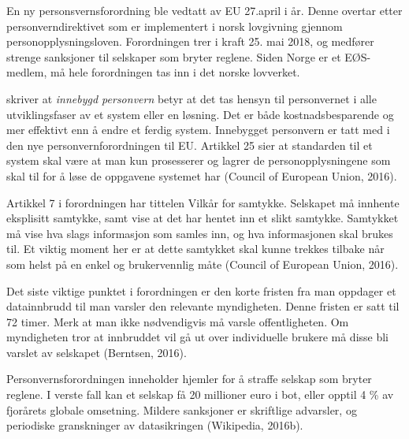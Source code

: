 En ny personsvernsforordning ble vedtatt av EU 27.april i år. Denne overtar
etter personverndirektivet som er implementert i norsk lovgivning gjennom
personopplysningsloven. Forordningen trer i kraft 25. mai 2018, og medfører
strenge sanksjoner til selskaper som bryter reglene. Siden Norge er et EØS-medlem,
må hele forordningen tas inn i det norske lovverket.

\citet{datatilsynet_privacy} skriver at \textit{innebygd personvern} betyr at det tas hensyn
til personvernet i alle utviklingsfaser av et system eller en løsning. Det er
både kostnadsbesparende og mer effektivt enn å endre et ferdig system. Innebygget
personvern er tatt med i den nye personvernforordningen til EU.
Artikkel 25 sier at standarden til et system skal være at man kun prosesserer
og lagrer de personopplysningene som skal til for å løse de oppgavene
systemet har (Council of European Union, 2016).

Artikkel 7 i forordningen har tittelen Vilkår for samtykke. Selskapet må
innhente eksplisitt samtykke, samt vise at det har hentet inn et slikt samtykke.
Samtykket må vise hva slags informasjon som samles inn, og hva informasjonen
skal brukes til. Et viktig moment her er at dette samtykket skal kunne
trekkes tilbake når som helst på en enkel og brukervennlig måte (Council of
European Union, 2016).

Det siste viktige punktet i forordningen er den korte fristen fra man oppdager
et datainnbrudd til man varsler den relevante myndigheten. Denne fristen er
satt til 72 timer. Merk at man ikke nødvendigvis må varsle offentligheten. Om
myndigheten tror at innbruddet vil gå ut over individuelle brukere må disse
bli varslet av selskapet (Berntsen, 2016).

Personvernsforordningen inneholder hjemler for å straffe selskap som bryter reglene.
I verste fall kan et selskap få 20 millioner euro i
bot, eller opptil 4 \% av fjorårets globale omsetning.
Mildere sanksjoner er skriftlige advarsler, og periodiske
granskninger av datasikringen (Wikipedia, 2016b).


